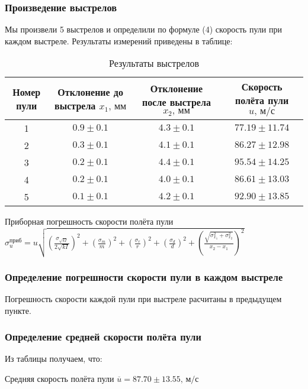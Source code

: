 \documentclass[a4paper]{article}
\begin{document}
\subsubsection{Произведение выстрелов}

Мы произвели 5 выстрелов и определили по формуле (4) скорость пули при каждом выстреле. Результаты измерений приведены в таблице:

\begin{table}[h!]
\centering
\caption{Результаты выстрелов}
\begin{tabular}{|c|c|c|c|}
\hline
Номер пули & Отклонение до выстрела  $x_1\text{, мм}$ & Отклонение после выстрела  $x_2\text{, мм}$ & Скорость полёта пули $u\text{, м/с}$\\ \hline
1  & $0.9\pm {0.1}$ & $4.3\pm {0.1}$ & $77.19\pm {11.74}$ \\ \hline
2  & $0.3\pm {0.1}$ & $4.1\pm {0.1}$ & $86.27\pm {12.98}$ \\ \hline
3  & $0.2\pm {0.1}$ & $4.4\pm {0.1}$ & $95.54\pm {14.25}$ \\ \hline
4  & $0.2\pm {0.1}$ & $4.0\pm {0.1}$ & $86.61\pm {13.03}$ \\ \hline
5  & $0.1\pm {0.1}$ & $4.2\pm {0.1}$ & $92.90\pm {13.85}$ \\ \hline

\end{tabular}
\end{table}

\item Приборная погрешность скорости полёта пули $\sigma_u^{\text{приб}} = u \sqrt{(\frac{\sigma_{\sqrt{kI}}}{2\sqrt{kI}})^2 + (\frac{\sigma_m}{m})^2 + (\frac{\sigma_r}{r})^2 + (\frac{\sigma_d}{d})^2 + (\frac{\sqrt{\sigma_{x_1}^2 + \sigma_{x_2}^2}}{x_2 - x_1})^2}$

\subsubsection{Определение погрешности скорости пули в каждом выстреле}

Погрешность скорости каждой пули при выстреле расчитаны в предыдущем пункте.

\subsubsection{Определение средней скорости полёта пули}

Из таблицы получаем, что:

\item Средняя скорость полёта пули $\overline{u} = 87.70 \pm{13.55} \text{, м/с}$
\end{document}
